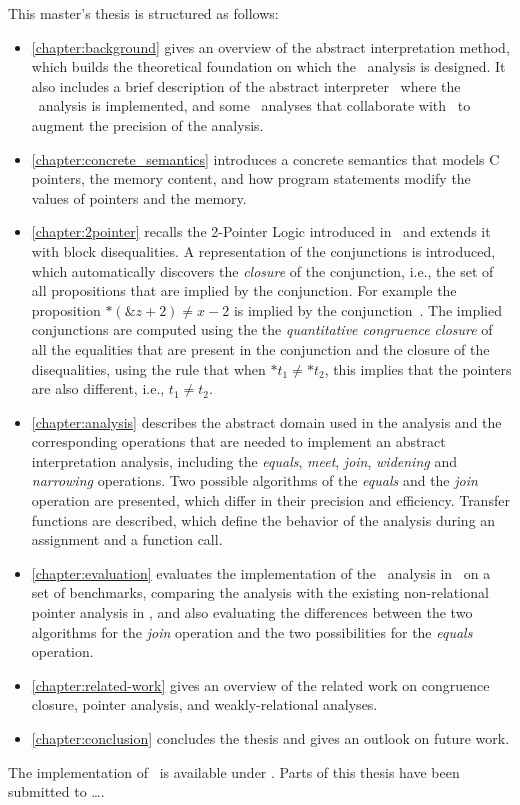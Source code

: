 This master's thesis is structured as follows:
\begin{itemize}
    \item \cref{chapter:background} gives an overview of the abstract interpretation method, which builds the theoretical foundation on which the \cpo\ analysis is designed.
    It also includes a brief description of the abstract interpreter \goblint\, where the \cpo\ analysis is implemented, and some \goblint\ analyses that collaborate with \cpo\ to augment the precision of the analysis.
    \item \cref{chapter:concrete_semantics} introduces a concrete semantics that models C pointers, the memory content, and how program statements modify the values of pointers and the memory.
    \item \cref{chapter:2pointer} recalls the 2-Pointer Logic introduced in~\cite{2pointer} and extends it with block disequalities.
    A representation of the conjunctions is introduced, which automatically discovers the \emph{closure} of the conjunction,
    i.e., the set of all propositions that are implied by the conjunction.
    For example the proposition $*(\&z + 2) \neq x - 2$ is implied by the conjunction~.
    The implied conjunctions are computed using the  the \emph{quantitative congruence closure} of all the equalities that are present in the conjunction and
    the closure of the disequalities, using the rule that when $*t_1 \neq *t_2$, this implies that the pointers are also different, i.e., $t_1 \neq t_2$.
    \item \cref{chapter:analysis} describes the abstract domain used in the analysis and the corresponding operations that are needed to implement an abstract interpretation analysis, including the \emph{equals}, \emph{meet}, \emph{join}, \emph{widening} and \emph{narrowing} operations.
    Two possible algorithms of the \emph{equals} and the \emph{join} operation are presented, which differ in
    their precision and efficiency.
    Transfer functions are described, which define the behavior of the analysis during an assignment and a function call.
    \item \cref{chapter:evaluation} evaluates the implementation of the \cpo\ analysis in \goblint\ on a set of benchmarks,
    comparing the analysis with the existing non-relational pointer analysis in \goblint, and also
    evaluating the differences between the two algorithms for the \emph{join} operation and the two possibilities for the \emph{equals} operation.
    \item \cref{chapter:related-work} gives an overview of the related work on congruence closure, pointer analysis, and weakly-relational analyses.
    \item \cref{chapter:conclusion} concludes the thesis and gives an outlook on future work.
\end{itemize}

The implementation of \cpo\ is available under . Parts of this thesis have been submitted to \dots.
